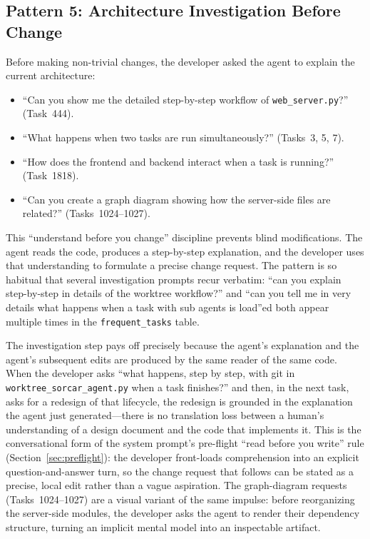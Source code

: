 \documentclass{article}
\begin{document}
\subsection{Pattern 5: Architecture Investigation Before Change}
\label{sec:p-investigate}

Before making non-trivial changes, the developer asked the agent to
explain the current architecture:

\begin{itemize}[nosep]
  \item ``Can you show me the detailed step-by-step workflow of
        \texttt{web\_server.py}?'' (Task~444).
  \item ``What happens when two tasks are run simultaneously?''
        (Tasks~3, 5, 7).
  \item ``How does the frontend and backend interact when a task is
        running?'' (Task~1818).
  \item ``Can you create a graph diagram showing how the server-side
        files are related?'' (Tasks~1024--1027).
\end{itemize}

This ``understand before you change'' discipline prevents blind
modifications.
The agent reads the code, produces a step-by-step explanation, and
the developer uses that understanding to formulate a precise change
request.
The pattern is so habitual that several investigation prompts recur
verbatim: ``can you explain step-by-step in details of the worktree
workflow?'' and ``can you tell me in very details what happens when a
task with sub agents is load''ed both appear multiple times in the
\texttt{frequent\_tasks} table.

The investigation step pays off precisely because the agent's
explanation and the agent's subsequent edits are produced by the same
reader of the same code.
When the developer asks ``what happens, step by step, with git in
\texttt{worktree\_sorcar\_agent.py} when a task finishes?'' and then,
in the next task, asks for a redesign of that lifecycle, the redesign
is grounded in the explanation the agent just generated---there is no
translation loss between a human's understanding of a design document
and the code that implements it.
This is the conversational form of the system prompt's pre-flight
``read before you write'' rule (Section~\ref{sec:preflight}):
the developer front-loads comprehension into an explicit
question-and-answer turn, so the change request that follows can be
stated as a precise, local edit rather than a vague aspiration.
The graph-diagram requests (Tasks~1024--1027) are a visual variant of
the same impulse: before reorganizing the server-side modules, the
developer asks the agent to render their dependency structure, turning
an implicit mental model into an inspectable artifact.
\end{document}
